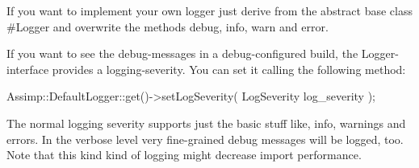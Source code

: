 If you want to implement your own logger just derive from the abstract base class \#\+Logger and overwrite the methods debug, info, warn and error.

If you want to see the debug-\/messages in a debug-\/configured build, the Logger-\/interface provides a logging-\/severity. You can set it calling the following method\+:


\begin{DoxyCode}
Assimp::DefaultLogger::get()->setLogSeverity( LogSeverity log\_severity );
\end{DoxyCode}


The normal logging severity supports just the basic stuff like, info, warnings and errors. In the verbose level very fine-\/grained debug messages will be logged, too. Note that this kind kind of logging might decrease import performance. 